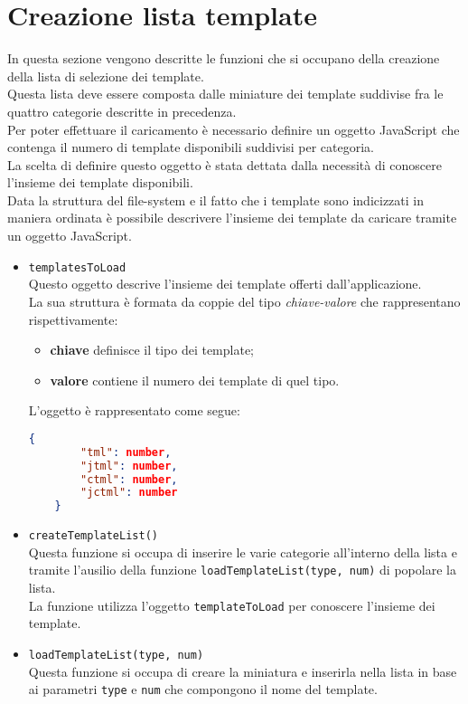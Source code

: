 \section{Creazione lista template}
In questa sezione vengono descritte le funzioni che si occupano della creazione della lista di selezione dei template.\\
Questa lista deve essere composta dalle miniature dei template suddivise fra le quattro categorie descritte in precedenza.\\
Per poter effettuare il caricamento è necessario definire un oggetto JavaScript che contenga il numero di template disponibili suddivisi per categoria.\\
La scelta di definire questo oggetto è stata dettata dalla necessità di conoscere l'insieme dei template disponibili.\\
Data la struttura del file-system e il fatto che i template sono indicizzati in maniera ordinata è possibile descrivere l'insieme dei template da caricare tramite un oggetto JavaScript.\\

\begin{itemize}
	\item \texttt{templatesToLoad} \label{ttlObject} \\
	Questo oggetto descrive l'insieme dei template offerti dall'applicazione.\\
	La sua struttura è formata da coppie del tipo \textit{chiave-valore} che rappresentano rispettivamente:
	\begin{itemize}
		\item \textbf{chiave} definisce il tipo dei template;
		\item \textbf{valore} contiene il numero dei template di quel tipo.
	\end{itemize}
	L'oggetto è rappresentato come segue:
	\begin{lstlisting}[language=JSON, caption=Struttura oggetto \texttt{templatesToLoad}.]
	{
		"tml": number,
		"jtml": number,
		"ctml": number,
		"jctml": number
	}
	\end{lstlisting}
	
	\item \texttt{createTemplateList()}\\
	Questa funzione si occupa di inserire le varie categorie all'interno della lista e tramite l'ausilio della funzione \texttt{loadTemplateList(type, num)} di popolare la lista.\\
	La funzione utilizza l'oggetto \texttt{templateToLoad} per conoscere l'insieme dei template.
	
	\item \texttt{loadTemplateList(type, num)}\\
	Questa funzione si occupa di creare la miniatura e inserirla nella lista in base ai parametri \texttt{type} e \texttt{num} che compongono il nome del template.
\end{itemize}

